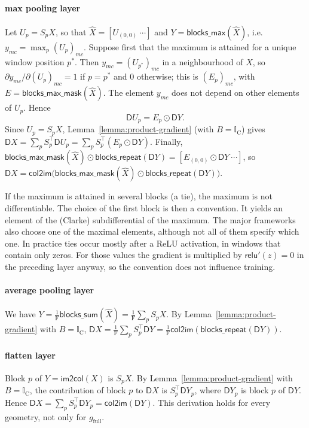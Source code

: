 \documentclass[twoside,11pt]{article}
\newcommand{\const}[1]{\ensuremath{\mathrm{#1}}} %
\newcommand{\func}[1]{\ensuremath{\textsf{#1}}}  %
\newcommand{\Gradient}{\textsf{D}}
\newcommand{\Fs}{\const{F}}          %
\newcommand{\im}{\func{im2col}}
\newcommand{\ci}{\func{col2im}}
\newcommand{\bsum}{\func{blocks\_sum}}
\newcommand{\brep}{\func{blocks\_repeat}}
\newcommand{\bmax}{\func{blocks\_max}}
\newcommand{\bmask}{\func{blocks\_max\_mask}}
\begin{document}
\paragraph{max pooling layer}
Let $U_p = S_p X$, so that $\hat X = [U_{(0,0)} \ \cdots]$ and $Y = \bmax(\hat X)$, i.e.\ $y_{mc} = \max_{p} (U_p)_{mc}$.
Suppose first that the maximum is attained for a unique window position $p^*$.
Then $y_{mc} = (U_{p^*})_{mc}$ in a neighbourhood of $X$, so $\partial y_{mc} / \partial (U_p)_{mc} = 1$ if $p = p^*$ and 0 otherwise; this is $(E_p)_{mc}$, with $E = \bmask(\hat X)$.
The element $y_{mc}$ does not depend on other elements of $U_p$. Hence
\[
\Gradient U_p = E_p \odot \Gradient Y.
\]
Since $U_p = S_p X$, Lemma~\ref{lemma:product-gradient} (with $B = \mathbb{I}_\const{C}$) gives $\Gradient X = \sum_p S_p^\top \Gradient U_p = \sum_p S_p^\top (E_p \odot \Gradient Y)$.
Finally, $\bmask(\hat X) \odot \brep(\Gradient Y) = [E_{(0,0)} \odot \Gradient Y \ \cdots]$, so $\Gradient X = \ci\big(\bmask(\hat X) \odot \brep(\Gradient Y)\big)$.

If the maximum is attained in several blocks (a tie), the maximum is not differentiable.
The choice of the first block is then a convention. It yields an element of the (Clarke) subdifferential of the maximum. The major frameworks also choose one of the maximal elements, although not all of them specify which one.
In practice ties occur mostly after a ReLU activation, in windows that contain only zeros. For those values the gradient is multiplied by $\func{relu}'(z) = 0$ in the preceding layer anyway, so the convention does not influence training.

\paragraph{average pooling layer}
We have $Y = \frac{1}{\Fs} \bsum(\hat X) = \frac{1}{\Fs} \sum_p S_p X$.
By Lemma~\ref{lemma:product-gradient} with $B = \mathbb{I}_\const{C}$, $\Gradient X = \frac{1}{\Fs} \sum_p S_p^\top \Gradient Y = \frac{1}{\Fs} \ci(\brep(\Gradient Y))$.

\paragraph{flatten layer}
Block $p$ of $Y = \im(X)$ is $S_p X$. By Lemma~\ref{lemma:product-gradient} with $B = \mathbb{I}_\const{C}$, the contribution of block $p$ to $\Gradient X$ is $S_p^\top \Gradient Y_p$, where $\Gradient Y_p$ is block $p$ of $\Gradient Y$. Hence $\Gradient X = \sum_p S_p^\top \Gradient Y_p = \ci(\Gradient Y)$. This derivation holds for every geometry, not only for $g_\text{full}$.
\end{document}

